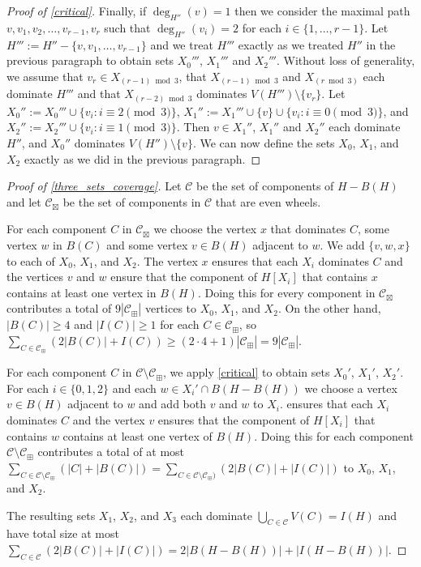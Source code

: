 \documentclass[a4paper,UKenglish,cleveref, autoref, thm-restate]{lipics-v2021}
\begin{document}
\begin{proof}[Proof of \cref{critical}]
  Finally, if $\deg_{H''}(v)=1$ then we consider the maximal path $v,v_1,v_2,\ldots,v_{r-1},v_r$ such that $\deg_{H''}(v_i)=2$ for each $i\in\{1,\ldots,r-1\}$.  Let $H''':=H''-\{v,v_1,\ldots,v_{r-1}\}$ and we treat $H'''$ exactly as we treated $H''$ in the previous paragraph to obtain sets $X_0'''$, $X_1'''$ and $X_2'''$.  Without loss of generality, we assume that $v_r\in X_{(r-1)\bmod 3}$, that $X_{(r-1)\bmod 3}$ and $X_{(r\bmod 3)}$ each dominate $H'''$ and that $X_{(r-2)\bmod 3}$ dominates  $V(H''')\setminus\{v_r\}$. Let $X_0'':=X_0'''\cup\{v_i:i\equiv 2\pmod 3\}$, $X_1'':=X_1'''\cup\{v\}\cup\{v_i:i\equiv 0\pmod 3\}$, and  $X_2'':=X_2'''\cup\{v_i:i\equiv 1\pmod 3\}$.  Then $v\in X_1''$, $X_1''$ and $X_2''$ each dominate $H''$, and $X_0''$ dominates $V(H'')\setminus\{v\}$.  We can now define the sets $X_0$, $X_1$, and $X_2$ exactly as we did in the previous paragraph.
\end{proof}

\begin{proof}[Proof of \cref{three_sets_coverage}]
  Let $\mathcal{C}$ be the set of components of $H-B(H)$
  and let $\mathcal{C}_{\boxtimes}$ be the set of components in $\mathcal{C}$  that are even wheels.

  For each component $C$ in $\mathcal{C}_{\boxtimes}$ we choose the vertex $x$ that dominates $C$, some vertex $w$ in $B(C)$ and some vertex $v\in B(H)$ adjacent to $w$.  We add $\{v,w,x\}$ to each of $X_0$, $X_1$, and $X_2$. The vertex $x$ ensures that each $X_i$ dominates $C$ and the vertices $v$ and $w$ ensure that the component of $H[X_i]$ that contains $x$ contains at least one vertex in $B(H)$.  Doing this for every component in $\mathcal{C}_{\boxtimes}$ contributes a total of $9|\mathcal{C}_{\boxplus}|$ vertices to $X_0$, $X_1$, and $X_2$. On the other hand, $|B(C)|\ge 4$ and $|I(C)|\ge 1$ for each $C\in \mathcal{C}_{\boxplus}$, so $\sum_{C\in \mathcal{C}_{\boxplus}} (2|B(C)| + I(C))\ge (2\cdot 4+1)|\mathcal{C}_{\boxplus}| = 9|\mathcal{C}_{\boxplus}|$.

  For each component $C$ in $\mathcal{C}\setminus\mathcal{C}_{\boxplus}$, we apply \cref{critical} to obtain sets $X_0'$, $X_1'$, $X_2'$. For each $i\in\{0,1,2\}$ and each $w\in X_i'\cap B(H-B(H))$ we choose a vertex $v\in B(H)$ adjacent to $w$ and add both $v$ and $w$ to $X_i$.  ensures that each $X_i$ dominates $C$ and the vertex $v$ ensures that the component of $H[X_i]$ that contains $w$ contains at least one vertex of $B(H)$.
  Doing this for each component $\mathcal{C}\setminus\mathcal{C}_\boxplus$ contributes a total of at most  $\sum_{C\in\mathcal{C}\setminus\mathcal{C}_{\boxplus}}(|C|+|B(C)|)=\sum_{C\in\mathcal{C}\setminus \mathcal{C}_{\boxplus})}(2|B(C)|+|I(C)|)$ to $X_0$, $X_1$, and $X_2$.

  The resulting sets $X_1$, $X_2$, and $X_3$ each dominate $\bigcup_{C\in\mathcal{C}} V(C)=I(H)$ and have total size at most $\sum_{C\in\mathcal{C}} (2|B(C)|+|I(C)|) = 2|B(H-B(H))| + |I(H-B(H))|$.
\end{proof}
\end{document}
